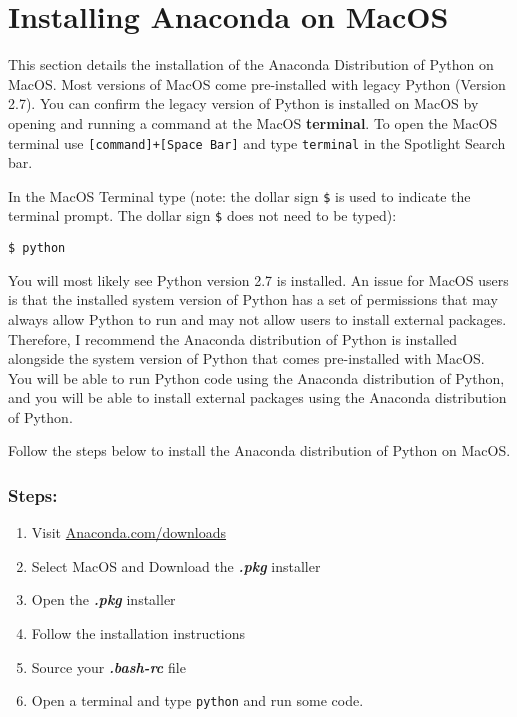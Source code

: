 \documentclass{book}
\newcommand{\passthrough}[1]{#1}
\begin{document}
    
        \hypertarget{installing-anaconda-on-macos}{%
\section{Installing Anaconda on
MacOS}\label{installing-anaconda-on-macos}}
    




    
        This section details the installation of the Anaconda Distribution of
Python on MacOS. Most versions of MacOS come pre-installed with legacy
Python (Version 2.7). You can confirm the legacy version of Python is
installed on MacOS by opening and running a command at the MacOS
\textbf{terminal}. To open the MacOS terminal use
\passthrough{\lstinline![command]+[Space Bar]!} and type
\passthrough{\lstinline!terminal!} in the Spotlight Search bar.

In the MacOS Terminal type (note: the dollar sign
\passthrough{\lstinline!$!} is used to indicate the terminal prompt. The
dollar sign \passthrough{\lstinline!$!} does not need to be typed):

\begin{lstlisting}
$ python
\end{lstlisting}

You will most likely see Python version 2.7 is installed. An issue for
MacOS users is that the installed system version of Python has a set of
permissions that may always allow Python to run and may not allow users
to install external packages. Therefore, I recommend the Anaconda
distribution of Python is installed alongside the system version of
Python that comes pre-installed with MacOS. You will be able to run
Python code using the Anaconda distribution of Python, and you will be
able to install external packages using the Anaconda distribution of
Python.

Follow the steps below to install the Anaconda distribution of Python on
MacOS.

\hypertarget{steps}{%
\subsubsection{Steps:}\label{steps}}

\begin{enumerate}
\def\labelenumi{\arabic{enumi}.}
\item
  Visit
  \href{https://www.anaconda.com/download/}{Anaconda.com/downloads}
\item
  Select MacOS and Download the \textbf{\emph{.pkg}} installer
\item
  Open the \textbf{\emph{.pkg}} installer
\item
  Follow the installation instructions
\item
  Source your \textbf{\emph{.bash-rc}} file
\item
  Open a terminal and type \passthrough{\lstinline!python!} and run some
  code.
\end{enumerate}
    
\end{document}
